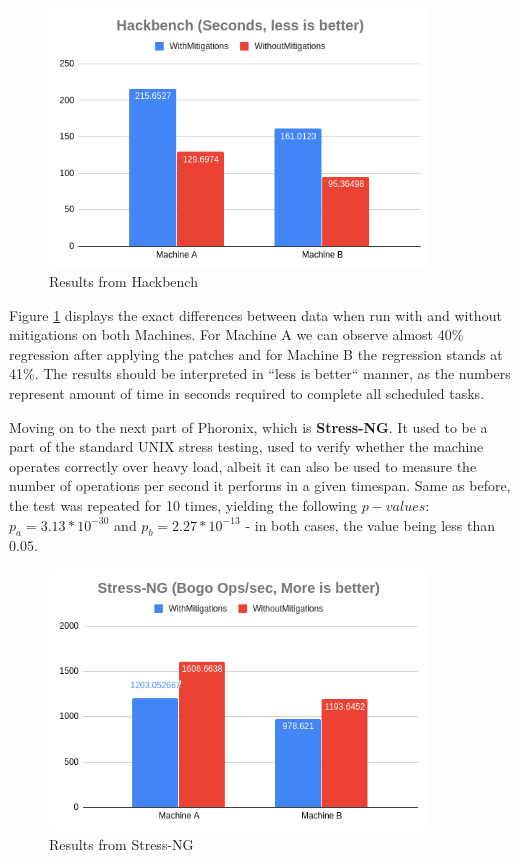 \documentclass{csfourzero}
\begin{document}
\begin{figure}[h]
\centering
\includegraphics[width=10cm]{hack}
\caption{Results from Hackbench}
\label{fig:hackbench}
\end{figure}

Figure \ref{fig:hackbench} displays the exact differences between data when run with and without mitigations on both Machines. For Machine A we can observe almost 40\% regression after applying the patches and for Machine B the regression stands at 41\%. The results should be interpreted in ``less is better`` manner, as the numbers represent amount of time in seconds required to complete all scheduled tasks.


Moving on to the next part of Phoronix, which is \textbf{Stress-NG}. It used to be a part of the standard UNIX stress testing, used to verify whether the machine operates correctly over heavy load, albeit it can also be used to measure the number of operations per second it performs in a given timespan. Same as before, the test was repeated for 10 times, yielding the following $p-values$: $p_{a} = 3.13 * 10^{-30}$ and $p_{b} = 2.27 * 10^{-13}$ - in both cases, the value being less than $0.05$.

\begin{figure}[h]
\centering
\includegraphics[width=10cm]{stress}
\caption{Results from Stress-NG}
\label{fig:stress}
\end{figure}
\end{document}

